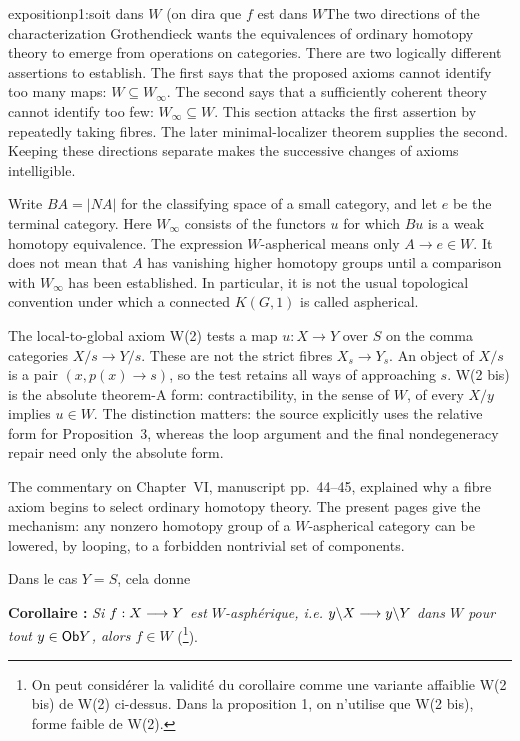 \begin{dcomment}{exposition}{p1:soit dans $W$ (on dira que $f$ est dans $W$}{The two directions of the characterization}
Grothendieck wants the equivalences of ordinary homotopy theory to emerge from operations on categories. There are two logically different assertions to establish. The first says that the proposed axioms cannot identify too many maps: \(W\subseteq W_\infty\). The second says that a sufficiently coherent theory cannot identify too few: \(W_\infty\subseteq W\). This section attacks the first assertion by repeatedly taking fibres. The later minimal-localizer theorem supplies the second. Keeping these directions separate makes the successive changes of axioms intelligible.

Write \(BA=|NA|\) for the classifying space of a small category, and let \(e\) be the terminal category. Here \(W_\infty\) consists of the functors \(u\) for which \(Bu\) is a weak homotopy equivalence. The expression \(W\)-aspherical means only \(A\to e\in W\). It does not mean that \(A\) has vanishing higher homotopy groups until a comparison with \(W_\infty\) has been established. In particular, it is not the usual topological convention under which a connected \(K(G,1)\) is called aspherical.

The local-to-global axiom W(2) tests a map \(u:X\to Y\) over \(S\) on the comma categories \(X/s\to Y/s\). These are not the strict fibres \(X_s\to Y_s\). An object of \(X/s\) is a pair \((x,p(x)\to s)\), so the test retains all ways of approaching \(s\). W(2 bis) is the absolute theorem-A form: contractibility, in the sense of \(W\), of every \(X/y\) implies \(u\in W\). The distinction matters: the source explicitly uses the relative form for Proposition~3, whereas the loop argument and the final nondegeneracy repair need only the absolute form.

The commentary on Chapter~VI, manuscript pp.~44--45, explained why a fibre axiom begins to select ordinary homotopy theory. The present pages give the mechanism: any nonzero homotopy group of a \(W\)-aspherical category can be lowered, by looping, to a forbidden nontrivial set of components.
\end{dcomment}




Dans le cas $Y = S$, cela donne

\textbf{Corollaire :} \textit{Si $f : X \longrightarrow Y$ est $W$-asphérique, i.e. $y\backslash X \longrightarrow y\backslash Y$} \textit{dans $W$ pour tout $y \in \mathsf{Ob} Y$, alors $f \in W$} (\footnote{On peut considérer la validité du corollaire comme une variante affaiblie W(2 bis) de W(2) ci-dessus. Dans la proposition 1, on n'utilise que W(2 bis), forme faible de W(2).}).


